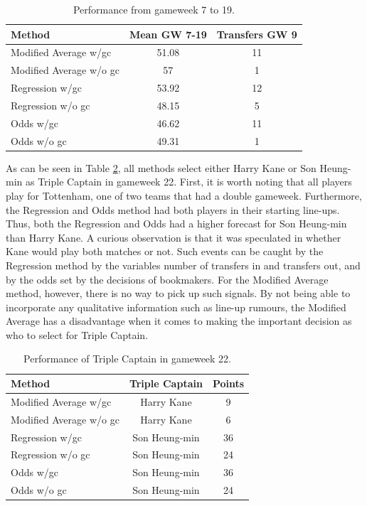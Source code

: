 \begin{table}[H]
\centering
\begin{tabular}{@{}lcc@{}}
\toprule
                Method  & Mean GW 7-19  & Transfers GW 9 \\ \midrule
Modified Average w/gc   & 51.08 & 11             \\
Modified Average w/o gc & 57    & 1              \\
Regression w/gc         & 53.92 & 12             \\
Regression w/o gc       & 48.15 & 5              \\
Odds w/gc               & 46.62 & 11             \\
Odds w/o gc             & 49.31 & 1              \\ \bottomrule
\end{tabular}
\caption{Performance from gameweek 7 to 19.}
\label{tab:first_wildcard}
\end{table}


As can be seen in Table \ref{tab:performance_triple_captain}, all methods select either Harry Kane or Son Heung-min as Triple Captain in gameweek 22. First, it is worth noting that all players play for Tottenham, one of two teams that had a double gameweek. Furthermore, the Regression and Odds method had both players in their starting line-ups. Thus, both the Regression and Odds had a higher forecast for Son Heung-min than Harry Kane. A curious observation is that it was speculated in whether Kane would play both matches or not. Such events can be caught by the Regression method by the variables number of transfers in and transfers out, and by the odds set by the decisions of bookmakers. For the Modified Average method, however, there is no way to pick up such signals. By not being able to incorporate any qualitative information such as line-up rumours, the Modified Average has a disadvantage when it comes to making the important decision as who to select for Triple Captain.

\begin{table}[H]
\centering
\begin{tabular}{@{}lcc@{}}
\toprule
                 Method       & Triple Captain & Points \\ \midrule
Modified Average w/gc   & Harry Kane           & 9      \\
Modified Average w/o gc & Harry Kane           & 6      \\
Regression w/gc         & Son Heung-min            & 36     \\
Regression w/o gc       & Son Heung-min            & 24     \\
Odds w/gc               & Son Heung-min            & 36     \\
Odds w/o gc             & Son Heung-min            & 24     \\ \bottomrule
\end{tabular}
\caption{Performance of Triple Captain in gameweek 22.}
\label{tab:performance_triple_captain}
\end{table}

